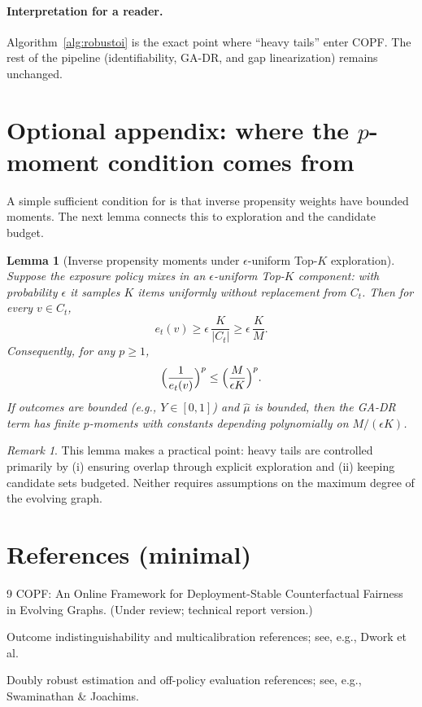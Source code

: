 \documentclass[11pt]{article}
\newcommand{\1}{\mathbf{1}}
\theoremstyle{plain}
\newtheorem{lemma}[theorem]{Lemma}
\theoremstyle{definition}
\theoremstyle{remark}
\newtheorem{remark}[theorem]{Remark}
\begin{document}
\paragraph{Interpretation for a reader.}
Algorithm~\ref{alg:robustoi} is the exact point where ``heavy tails'' enter COPF.
The rest of the pipeline (identifiability, GA-DR, and gap linearization) remains unchanged.

\section{Optional appendix: where the $p$-moment condition comes from}
\label{sec:appendix}

A simple sufficient condition for  is that inverse propensity weights have bounded moments.
The next lemma connects this to exploration and the candidate budget.

\begin{lemma}[Inverse propensity moments under $\epsilon$-uniform Top-$K$ exploration]\label{lem:prop}
Suppose the exposure policy mixes in an $\epsilon$-uniform Top-$K$ component:
with probability $\epsilon$ it samples $K$ items uniformly without replacement from $C_t$.
Then for every $v\in C_t$,
\[
e_t(v)\ge \epsilon\,\frac{K}{|C_t|} \ge \epsilon\,\frac{K}{M}.
\]
Consequently, for any $p\ge 1$,
\[
\Bigl(\frac{1}{e_t(v)}\Bigr)^p \le \Bigl(\frac{M}{\epsilon K}\Bigr)^p.
\]
If outcomes are bounded (e.g., $Y\in[0,1]$) and $\hat\mu$ is bounded, then the GA-DR term
has finite $p$-moments with constants depending polynomially on $M/(\epsilon K)$.
\end{lemma}

\begin{remark}
This lemma makes a practical point: heavy tails are controlled primarily by (i) ensuring overlap through
explicit exploration and (ii) keeping candidate sets budgeted.
Neither requires assumptions on the maximum degree of the evolving graph.
\end{remark}

\section*{References (minimal)}
\begin{thebibliography}{9}
COPF: An Online Framework for Deployment-Stable Counterfactual Fairness in Evolving Graphs.
(Under review; technical report version.)

Outcome indistinguishability and multicalibration references; see, e.g., Dwork et al.

Doubly robust estimation and off-policy evaluation references; see, e.g., Swaminathan \& Joachims.
\end{thebibliography}
\end{document}
